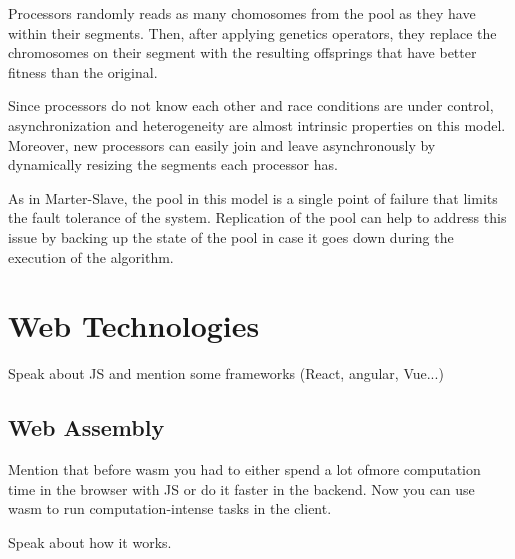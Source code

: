 Processors randomly reads as many chomosomes from the pool as they have within their segments. Then, after applying genetics operators, they replace the chromosomes on their segment with the resulting offsprings that have better fitness than the original. 

Since processors do not know each other and race conditions are under control, asynchronization and heterogeneity are almost intrinsic properties on this model. Moreover, new processors can easily join and leave asynchronously by dynamically resizing the segments each processor has.

As in Marter-Slave, the pool in this model is a single point of failure that limits the fault tolerance of the system. Replication of the pool can help to address this issue by backing up the state of the pool in case it goes down during the execution of the algorithm. 

\section{Web Technologies}
Speak about JS and mention some frameworks (React, angular, Vue...)

\subsection{Web Assembly}
Mention that before wasm you had to either spend a lot ofmore computation time in the browser with JS or do it faster in the backend. Now you can use wasm to run computation-intense tasks in the client.

Speak about how it works.